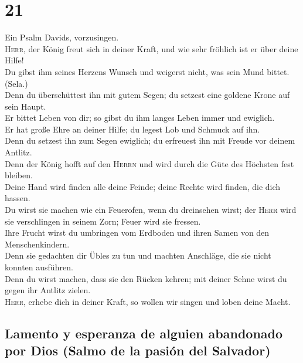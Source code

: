 \hypertarget{section-20}{%
\section{21}\label{section-20}}

 Ein Psalm Davids, vorzusingen.\\
 \textsc{Herr}, der König freut sich in deiner Kraft, und
wie sehr fröhlich ist er über deine Hilfe!\\
 Du gibst ihm seines Herzens Wunsch und weigerst nicht,
was sein Mund bittet. (Sela.)\\
 Denn du überschüttest ihn mit gutem Segen; du setzest
eine goldene Krone auf sein Haupt.\\
 Er bittet Leben von dir; so gibst du ihm langes Leben
immer und ewiglich.\\
 Er hat große Ehre an deiner Hilfe; du legest Lob und
Schmuck auf ihn.\\
 Denn du setzest ihn zum Segen ewiglich; du erfreuest ihn
mit Freude vor deinem Antlitz.\\
 Denn der König hofft auf den \textsc{Herrn} und wird
durch die Güte des Höchsten fest bleiben.\\
 Deine Hand wird finden alle deine Feinde; deine Rechte
wird finden, die dich hassen.\\
 Du wirst sie machen wie ein Feuerofen, wenn du
dreinsehen wirst; der \textsc{Herr} wird sie verschlingen in seinem
Zorn; Feuer wird sie fressen.\\
 Ihre Frucht wirst du umbringen vom Erdboden und ihren
Samen von den Menschenkindern.\\
 Denn sie gedachten dir Übles zu tun und machten
Anschläge, die sie nicht konnten ausführen.\\
 Denn du wirst machen, dass sie den Rücken kehren; mit
deiner Sehne wirst du gegen ihr Antlitz zielen.\\
 \textsc{Herr}, erhebe dich in deiner Kraft, so wollen
wir singen und loben deine Macht.

\hypertarget{lamento-y-esperanza-de-alguien-abandonado-por-dios-salmo-de-la-pasiuxf3n-del-salvador}{%
\subsection{Lamento y esperanza de alguien abandonado por Dios (Salmo de
la pasión del
Salvador)}\label{lamento-y-esperanza-de-alguien-abandonado-por-dios-salmo-de-la-pasiuxf3n-del-salvador}}

